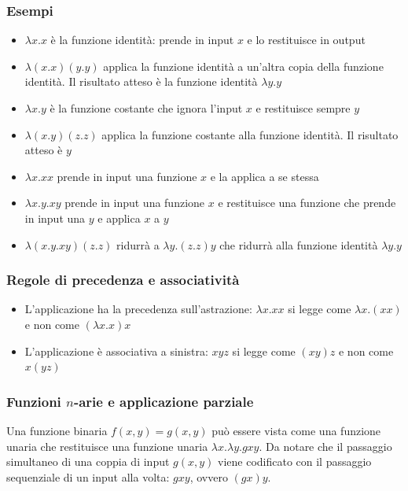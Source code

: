 \documentclass{article}
\begin{document}
\subsubsection{Esempi}
\begin{itemize}
    \item $\lambda x.x$ è la funzione identità: prende in input $x$ e lo restituisce in output
    \item $\lambda(x.x)(y.y)$ applica la funzione identità a un'altra copia della funzione identità. Il risultato atteso è la funzione identità $\lambda y.y$
    \item $\lambda x.y$ è la funzione costante che ignora l’input $x$ e restituisce sempre $y$
    \item $\lambda(x.y)(z.z)$ applica la funzione costante alla funzione identità. Il risultato atteso è $y$
    \item $\lambda x.xx$ prende in input una funzione $x$ e la applica a se stessa
    \item $\lambda x.y.xy$ prende in input una funzione $x$ e restituisce una funzione che prende in input una $y$ e applica $x$ a $y$
    \item $\lambda(x.y.xy)(z.z)$ ridurrà a $\lambda y.(z.z)y$ che ridurrà alla funzione identità $\lambda y.y$
\end{itemize}

\subsubsection{Regole di precedenza e associatività}
\begin{itemize}
    \item L'applicazione ha la precedenza sull'astrazione: $\lambda x.xx$ si legge come $\lambda x.(xx)$ e non come $(\lambda x.x)x$
    \item L'applicazione è associativa a sinistra: $xyz$ si legge come $(xy)z$ e non come $x(yz)$
\end{itemize}

\subsubsection{Funzioni $n$-arie e applicazione parziale}
Una funzione binaria $f(x,y) = g(x, y)$ può essere vista come una funzione unaria che restituisce una funzione unaria $\lambda x.\lambda y.gxy$. Da notare che il passaggio simultaneo di una coppia di input $g(x,y)$ viene codificato con il passaggio sequenziale di un input alla volta: $gxy$, ovvero $(gx)y$.
\end{document}
